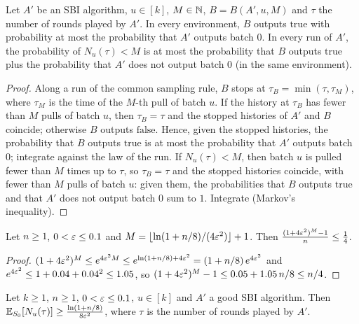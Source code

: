 \begin{lemma}
  \label{lem:stop_at_pulls_output}
  \leanok
  Let $A'$ be an SBI algorithm, $u \in [k]$, $M \in \mathbb{N}$, $B = B(A', u, M)$ and $\tau$ the number of
  rounds played by $A'$. In every environment, $B$ outputs $\mathrm{true}$ with probability at most
  the probability that $A'$ outputs batch $0$. In every run of $A'$, the probability of
  $N_u(\tau) < M$ is at most the probability that $B$ outputs $\mathrm{true}$ plus the probability
  that $A'$ does not output batch $0$ (in the same environment).
\end{lemma}

\begin{proof}
  \leanok
  Along a run of the common sampling rule, $B$ stops at $\tau_B = \min(\tau, \tau_M)$, where
  $\tau_M$ is the time of the $M$-th pull of batch $u$. If the history at $\tau_B$ has fewer than
  $M$ pulls of batch $u$, then $\tau_B = \tau$ and the stopped histories of $A'$ and $B$ coincide;
  otherwise $B$ outputs $\mathrm{false}$. Hence, given the stopped histories, the probability that
  $B$ outputs $\mathrm{true}$ is at most the probability that $A'$ outputs batch $0$; integrate
  against the law of the run. If $N_u(\tau) < M$, then batch $u$ is pulled fewer than $M$ times up
  to $\tau$, so $\tau_B = \tau$ and the stopped histories coincide, with fewer than $M$ pulls of
  batch $u$: given them, the probabilities that $B$ outputs $\mathrm{true}$ and that $A'$ does not
  output batch $0$ sum to $1$. Integrate (Markov's inequality).
\end{proof}

\begin{lemma}
  \label{lem:two_batch_arith}
  \leanok
  Let $n \ge 1$, $0 < \varepsilon \le 0.1$ and $M = \lfloor \ln(1 + n/8)/(4\varepsilon^2) \rfloor + 1$. Then
  $\frac{(1 + 4\varepsilon^2)^M - 1}{n} \le \frac14$.
\end{lemma}

\begin{proof}
  \leanok
  $(1 + 4\varepsilon^2)^M \le e^{4\varepsilon^2 M} \le e^{\ln(1 + n/8) + 4\varepsilon^2} = (1 + n/8)\, e^{4\varepsilon^2}$ and
  $e^{4\varepsilon^2} \le 1 + 0.04 + 0.04^2 \le 1.05$, so
  $(1 + 4\varepsilon^2)^M - 1 \le 0.05 + 1.05\, n/8 \le n/4$.
\end{proof}

\begin{lemma}
  \label{lem:two_batch_general}
  \leanok
  Let $k \ge 1$, $n \ge 1$, $0 < \varepsilon \le 0.1$, $u \in [k]$ and $A'$ a good SBI algorithm. Then
  $\mathbb{E}_{S_0}[N_u(\tau)] \ge \frac{\ln(1 + n/8)}{8 \varepsilon^2}$, where $\tau$ is the number of rounds
  played by $A'$.
\end{lemma}

